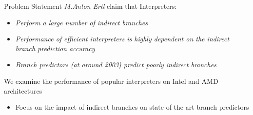 \documentclass[10pt]{beamer}
\begin{document}
\begin{frame}{Problem Statement}
	\textit{M.Anton Ertl\footnotemark[1]} claim that Interpreters:
    \begin{itemize}
    	\item{\textit{Perform a large number of indirect branches}} 
        \item{\textit{Performance of efficient interpreters is highly dependent on the indirect branch prediction accuracy }} 
        \item{{\textit{Branch predictors (at around 2003) predict poorly indirect branches}}}
     \end{itemize}
     We examine the performance of popular interpreters on Intel and AMD architectures
		 \begin{itemize}
		     \item {Focus on the impact of indirect branches on state of the art branch predictors }
	     \end{itemize}

\end{frame}

\end{document}
